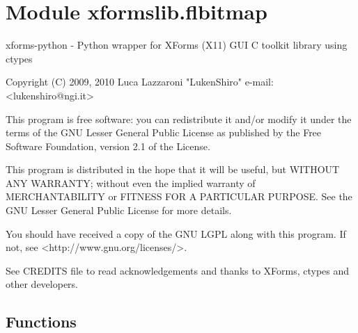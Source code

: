 %
%
%


\section{Module xformslib.flbitmap}

    \label{xformslib:flbitmap}
xforms-python - Python wrapper for XForms (X11) GUI C toolkit library using
ctypes

Copyright (C) 2009, 2010  Luca Lazzaroni "LukenShiro" e-mail: 
{\textless}lukenshiro@ngi.it{\textgreater}

This program is free software: you can redistribute it and/or modify it 
under the terms of the GNU Lesser General Public License as published by 
the Free Software Foundation, version 2.1 of the License.

This program is distributed in the hope that it will be useful, but WITHOUT
ANY WARRANTY; without even the implied warranty of MERCHANTABILITY or 
FITNESS FOR A PARTICULAR PURPOSE. See the GNU Lesser General Public License
for more details.

You should have received a copy of the GNU LGPL along with this program. If
not, see {\textless}http://www.gnu.org/licenses/{\textgreater}.

See CREDITS file to read acknowledgements and thanks to XForms, ctypes and 
other developers.



  \subsection{Functions}

    \label{xformslib:flbitmap:fl_add_bitmap}

